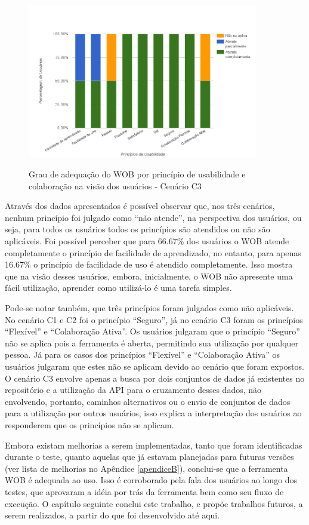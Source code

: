 \begin{figure}[!htb]
    \centering
    \caption{Grau de adequação do WOB por princípio de usabilidade e colaboração na visão dos usuários - Cenário C3}
    \includegraphics[width=0.9\textwidth]{./04-figuras/avaliacao-cenario3}
    \label{fig:avaliacao-cenario3}
\end{figure}


Através dos dados apresentados é possível observar que, nos três cenários, nenhum princípio 
foi julgado como “não atende”, na perspectiva dos usuários, ou seja, para todos os usuários 
todos os princípios são atendidos ou não são aplicáveis. Foi possível perceber que para 
66.67\% dos usuários o WOB atende completamente o princípio de facilidade de aprendizado, no 
entanto, para apenas 16.67\% o princípio de facilidade de uso é atendido completamente. Isso 
mostra que na visão desses usuários, embora, inicialmente, o WOB não apresente uma fácil 
utilização, aprender como utilizá-lo é uma tarefa simples. 

Pode-se notar também, que três princípios foram julgados como não aplicáveis. No cenário 
C1 e C2 foi o princípio “Seguro”, já no cenário C3 foram os princípios “Flexível” e 
“Colaboração Ativa”. Os usuários julgaram que o princípio “Seguro” não se aplica pois a 
ferramenta é aberta, permitindo sua utilização por qualquer pessoa. Já para os casos dos 
princípios “Flexível” e “Colaboração Ativa” os usuários julgaram que estes não se aplicam 
devido ao cenário que foram expostos. O cenário C3 envolve apenas a busca por dois 
conjuntos de dados já existentes no repositório e a utilização da API para o cruzamento 
desses dados, não envolvendo, portanto, caminhos alternativos ou o envio de conjuntos de 
dados para a utilização por outros usuários, isso explica a interpretação dos usuários 
ao responderem que os princípios não se aplicam.

Embora existam melhorias a serem implementadas, tanto que foram identificadas durante o 
teste, quanto aquelas que já estavam planejadas para futuras versões (ver lista de 
melhorias no Apêndice \ref{apendiceB}), conclui-se que a ferramenta WOB é adequada ao uso. 
Isso é corroborado pela fala dos usuários ao longo dos testes, que aprovaram a idéia por trás
da ferramenta bem como seu fluxo de execução. O capítulo seguinte conclui este trabalho, e 
propõe trabalhos futuros, a serem realizados, a partir do que foi desenvolvido até aqui.
